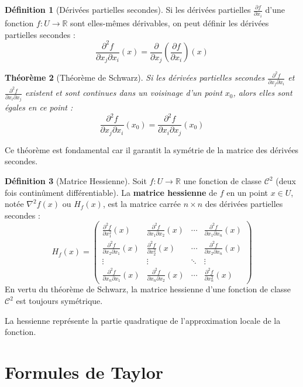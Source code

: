 \documentclass[a4paper,12pt,openany]{book}
\theoremstyle{plain}
\newtheorem{theorem}{Théorème}[section]
\theoremstyle{definition}
\newtheorem{definition}[theorem]{Définition}
\theoremstyle{remark}
\theoremstyle{nbstyle}
\newcommand{\R}{\mathbb{R}}
\newcommand{\hess}{\nabla^2}
\begin{document}
	\begin{definition}[Dérivées partielles secondes]
		Si les dérivées partielles $\frac{\partial f}{\partial x_i}$ d'une fonction $f: U \to \R$ sont elles-mêmes dérivables, on peut définir les dérivées partielles secondes :
		$$ \frac{\partial^2 f}{\partial x_j \partial x_i}(x) = \frac{\partial}{\partial x_j}\left(\frac{\partial f}{\partial x_i}\right)(x) $$
	\end{definition}
	
	\begin{theorem}[Théorème de Schwarz]
		Si les dérivées partielles secondes $\frac{\partial^2 f}{\partial x_j \partial x_i}$ et $\frac{\partial^2 f}{\partial x_i \partial x_j}$ existent et sont continues dans un voisinage d'un point $x_0$, alors elles sont égales en ce point :
		$$ \frac{\partial^2 f}{\partial x_j \partial x_i}(x_0) = \frac{\partial^2 f}{\partial x_i \partial x_j}(x_0) $$
	\end{theorem}
	Ce théorème est fondamental car il garantit la symétrie de la matrice des dérivées secondes.
	
	\begin{definition}[Matrice Hessienne]
		Soit $f: U \to \R$ une fonction de classe $\mathcal{C}^2$ (deux fois continûment différentiable). La \textbf{matrice hessienne} de $f$ en un point $x \in U$, notée $\hess f(x)$ ou $H_f(x)$, est la matrice carrée $n \times n$ des dérivées partielles secondes :
		$$ H_f(x) = \begin{pmatrix}
		\frac{\partial^2 f}{\partial x_1^2}(x) & \frac{\partial^2 f}{\partial x_1 \partial x_2}(x) & \cdots & \frac{\partial^2 f}{\partial x_1 \partial x_n}(x) \\
		\frac{\partial^2 f}{\partial x_2 \partial x_1}(x) & \frac{\partial^2 f}{\partial x_2^2}(x) & \cdots & \frac{\partial^2 f}{\partial x_2 \partial x_n}(x) \\
		\vdots & \vdots & \ddots & \vdots \\
		\frac{\partial^2 f}{\partial x_n \partial x_1}(x) & \frac{\partial^2 f}{\partial x_n \partial x_2}(x) & \cdots & \frac{\partial^2 f}{\partial x_n^2}(x)
		\end{pmatrix} $$
		En vertu du théorème de Schwarz, la matrice hessienne d'une fonction de classe $\mathcal{C}^2$ est toujours symétrique.
	\end{definition}
	La hessienne représente la partie quadratique de l'approximation locale de la fonction.
	
	\section{Formules de Taylor}
	
\end{document}
